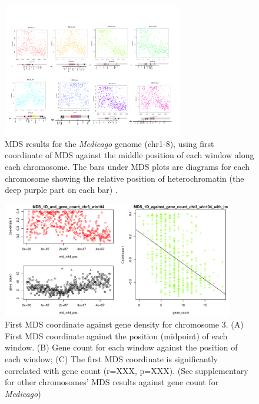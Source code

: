 \documentclass[11pt, oneside]{article}   	%
\begin{document}
\begin{figure}
    \begin{center}
       \includegraphics[width=0.7\textwidth]{fig5}
    \end{center}
    \caption{
         MDS results for the \textit{Medicago} genome (chr1-8), using first coordinate of MDS against the middle position of each window along each chromosome. 
         The bars under MDS plots are diagrams for each chromosome showing the relative position of heterochromatin (the deep purple part on each bar) \citep{kulikova2004satellite, kulikova2001integration}.
        \label{fig:mds_medicago}
    }
\end{figure}


\begin{figure}
    \begin{center}
       \includegraphics[width=0.9\textwidth]{Fig6_MDS_1D_and_gene_count_and_lm_chr3_based_all_chr_win104}
    \end{center}
    \caption{
        First MDS coordinate against gene density for chromosome 3. 
        (A) First MDS coordinate against the position (midpoint) of each window. 
        (B) Gene count for each window against the position of each window; 
        (C) The first MDS coordinate is significantly correlated with gene count (r=XXX, p=XXX). 
        (See supplementary for other chromosomes' MDS results against gene count for \textit{Medicago})
        \label{fig:mds_gene_count}
    }
\end{figure}
\end{document}
